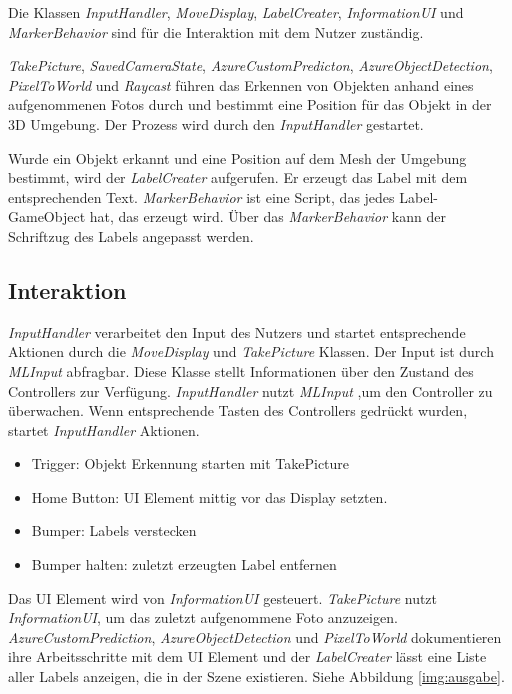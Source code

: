 Die Klassen \textit{InputHandler}, \textit{MoveDisplay}, \textit{LabelCreater}, \textit{InformationUI} und \textit{MarkerBehavior} sind für die Interaktion mit dem Nutzer zuständig. 

\textit{TakePicture}, \textit{SavedCameraState}, \textit{AzureCustomPredicton}, \textit{AzureObjectDetection}, \textit{PixelToWorld} und \textit{Raycast} führen das Erkennen von Objekten anhand eines aufgenommenen Fotos durch und bestimmt eine Position für das Objekt in der 3D Umgebung. Der Prozess wird durch den \textit{InputHandler} gestartet. 

Wurde ein Objekt erkannt und eine Position auf dem Mesh der Umgebung bestimmt, wird der \textit{LabelCreater} aufgerufen. Er erzeugt das Label mit dem entsprechenden Text. \textit{MarkerBehavior} ist eine Script, das jedes Label-GameObject hat, das erzeugt wird. Über das \textit{MarkerBehavior} kann der Schriftzug des Labels angepasst werden.

\subsection{Interaktion}

\textit{InputHandler} verarbeitet den Input des Nutzers und startet entsprechende Aktionen durch die \textit{MoveDisplay} und \textit{TakePicture} Klassen. Der Input ist durch \textit{MLInput} abfragbar. Diese Klasse stellt Informationen über den Zustand des Controllers zur Verfügung. \textit{InputHandler} nutzt \textit{MLInput} ,um den Controller zu überwachen. Wenn entsprechende Tasten des Controllers gedrückt wurden, startet \textit{InputHandler} Aktionen.

\begin{itemize}
	\item Trigger: Objekt Erkennung starten mit TakePicture
	\item Home Button: UI Element mittig vor das Display setzten.
	\item Bumper: Labels verstecken
	\item Bumper halten: zuletzt erzeugten Label entfernen 
\end{itemize}

Das UI Element wird von \textit{InformationUI} gesteuert. \textit{TakePicture} nutzt \textit{InformationUI}, um das zuletzt aufgenommene Foto anzuzeigen. \textit{AzureCustomPrediction}, \textit{AzureObjectDetection} und \textit{PixelToWorld} dokumentieren ihre Arbeitsschritte mit dem UI Element und der \textit{LabelCreater} lässt eine Liste aller Labels anzeigen, die in der Szene existieren. Siehe Abbildung \ref{img:ausgabe}.

